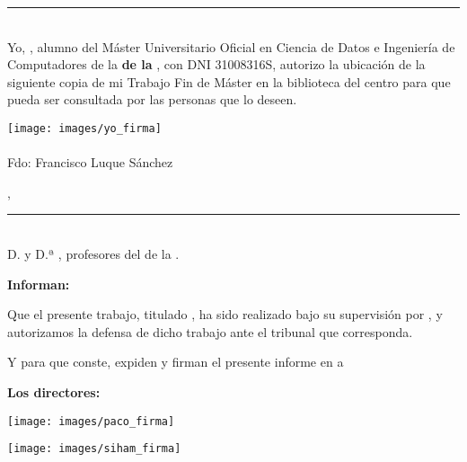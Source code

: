 \documentclass['../proyecto.tex']{memoir}
\begin{document}
\thispagestyle{empty}

\noindent\rule[-1ex]{\textwidth}{2pt}\\[4.5ex]

Yo, \textbf{\AuthorName}, alumno del Máster Universitario Oficial en
Ciencia de Datos e Ingeniería de Computadores de la
\textbf{\FacultyOne de la \University}, con DNI 31008316S, autorizo la
ubicación de la siguiente copia de mi Trabajo Fin de Máster en la
biblioteca del centro para que pueda ser consultada por las personas
que lo deseen.

\vspace{6cm}

\texttt{[image: images/yo\_firma]}
\\~\\
\noindent Fdo: Francisco Luque Sánchez

\vspace{2cm}

\begin{flushright}
  \Location, \Time
\end{flushright}

\newpage

\thispagestyle{empty}

\noindent\rule[-1ex]{\textwidth}{2pt}\\[4.5ex]

D. \textbf{\MainProf} y D.ª \textbf{\SecondProf}, profesores del
\Department de la \University.

\vspace{0.5cm}

\textbf{Informan:}

\vspace{0.5cm}

Que el presente trabajo, titulado \textit{\textbf{\ProjectTitle}}, ha
sido realizado bajo su supervisión por \textbf{\AuthorName}, y
autorizamos la defensa de dicho trabajo ante el tribunal que
corresponda.

\vspace{0.5cm}

Y para que conste, expiden y firman el presente informe en \Location a \Time

\vspace{1cm}

\textbf{Los directores:}

\vspace{5cm}

\begin{minipage}{0.45\linewidth}
  \begin{center}
    \texttt{[image: images/paco\_firma]}
    \textbf{\MainProf}
  \end{center}
\end{minipage}
\begin{minipage}{0.45\linewidth}
  \begin{center}
  \texttt{[image: images/siham\_firma]}
   \textbf{\SecondProf}
  \end{center}
\end{minipage}

\newpage
\end{document}
